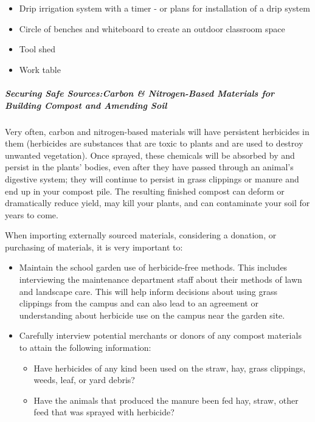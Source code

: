 \documentclass[12pt,]{article}
\providecommand{\tightlist}{%
  \setlength{\itemsep}{0pt}\setlength{\parskip}{0pt}}
\let\oldsubparagraph\subparagraph
\renewcommand{\subparagraph}[1]{\oldsubparagraph{#1}\mbox{}}
\begin{document}
\begin{itemize}
\tightlist
\item
  Drip irrigation system with a timer - or plans for installation of a drip system
\item
  Circle of benches and whiteboard to create an outdoor classroom space
\item
  Tool shed
\item
  Work table
\end{itemize}

\hypertarget{securing-safe-sources-carbon-nitrogen-based-materials-for-building-compost-and-amending-soil}{%
\subparagraph{\texorpdfstring{Securing Safe Sources:Carbon \& Nitrogen-Based Materials for Building Compost and Amending Soil}{Securing Safe Sources: Carbon \& Nitrogen-Based Materials for Building Compost and Amending Soil}}\label{securing-safe-sources-carbon-nitrogen-based-materials-for-building-compost-and-amending-soil}}

Very often, carbon and nitrogen-based materials will have persistent herbicides in them (herbicides are substances that are toxic to plants and are used to destroy unwanted vegetation). Once sprayed, these chemicals will be absorbed by and persist in the plants' bodies, even after they have passed through an animal's digestive system; they will continue to persist in grass clippings or manure and end up in your compost pile. The resulting finished compost can deform or dramatically reduce yield, may kill your plants, and can contaminate your soil for years to come.

When importing externally sourced materials, considering a donation, or purchasing of materials, it is very important to:

\begin{itemize}
\tightlist
\item
  Maintain the school garden use of herbicide-free methods. This includes interviewing the maintenance department staff about their methods of lawn and landscape care. This will help inform decisions about using grass clippings from the campus and can also lead to an agreement or understanding about herbicide use on the campus near the garden site.
\item
  Carefully interview potential merchants or donors of any compost materials to attain the following information:

  \begin{itemize}
  \tightlist
  \item
    Have herbicides of any kind been used on the straw, hay, grass clippings, weeds, leaf, or yard debris?
  \item
    Have the animals that produced the manure been fed hay, straw, other feed that was sprayed with herbicide?
  \end{itemize}
\end{itemize}
\end{document}
